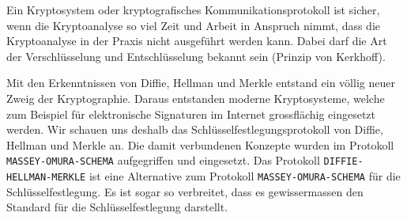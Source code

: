\begin{definition}
	Ein Kryptosystem oder kryptografisches Kommunikationsprotokoll ist sicher, wenn die Kryptoanalyse so viel Zeit und Arbeit in Anspruch nimmt, dass die Kryptoanalyse in der Praxis nicht ausgeführt werden kann. Dabei darf die Art der Verschlüsselung und Entschlüsselung bekannt sein (Prinzip von Kerkhoff).
\end{definition}

Mit den Erkenntnissen von Diffie, Hellman und Merkle entstand ein völlig neuer Zweig der Kryptographie. Daraus entstanden moderne Kryptosysteme, welche zum Beispiel für elektronische Signaturen im Internet grossflächig eingesetzt werden. Wir schauen uns deshalb das Schlüsselfestlegungsprotokoll von Diffie, Hellman und Merkle an. Die damit verbundenen Konzepte wurden im Protokoll \texttt{MASSEY-OMURA-SCHEMA} aufgegriffen und eingesetzt. Das Protokoll \texttt{DIFFIE-HELLMAN-MERKLE} ist eine Alternative zum Protokoll \texttt{MASSEY-OMURA-SCHEMA} für die Schlüsselfestlegung. Es ist sogar so verbreitet, dass es gewissermassen den Standard für die Schlüsselfestlegung darstellt.